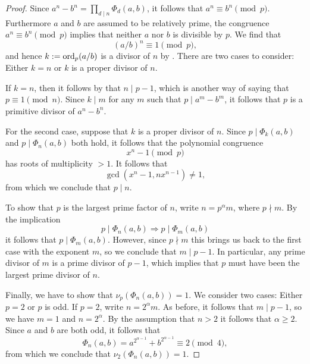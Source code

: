 \begin{proof}
  Since $a^n-b^n=\prod_{d\mid n}\Phi_d(a,b)$, it follows that $a^n\equiv b^n\pmod{p}$. Furthermore $a$ and $b$ are assumed to be relatively prime, the congruence $a^n\equiv b^n\pmod{p}$ implies that neither $a$ nor $b$ is divisible by $p$. We find that
  \begin{equation*}
    (a/b)^n\equiv 1\pmod{p},
  \end{equation*}
  and hence $k:=\operatorname{ord}_p(a/b)$ is a divisor of $n$ by . There are two cases to consider: Either $k=n$ or $k$ is a proper divisor of $n$.

  If $k=n$, then it follows by  that $n\mid p-1$, which is another way of saying that $p\equiv 1\pmod{n}$. Since $k\mid m$ for any $m$ such that $p\mid a^m-b^m$, it follows that $p$ is a primitive divisor of $a^n-b^n$.
  
  For the second case, suppose that $k$ is a proper divisor of $n$. Since $p\mid \Phi_k(a,b)$ and $p\mid \Phi_n(a,b)$ both hold, it follows that the polynomial congruence
  \begin{equation*}
    x^n-1\pmod{p}
  \end{equation*}
  has roots of multiplicity $>1$. It follows that
  \begin{equation*}
    \gcd(x^n-1,nx^{n-1})\neq 1,
  \end{equation*}
  from which we conclude that $p\mid n$.

  To show that $p$ is the largest prime factor of $n$, write $n=p^\alpha m$, where $p\nmid m$. By the implication
  \begin{equation*}
    p\mid \Phi_n(a,b)\Rightarrow p\mid \Phi_m(a,b)
  \end{equation*}
  it follows that $p\mid \Phi_m(a,b)$. However, since $p\nmid m$ this brings us back to the first case with the exponent $m$, so we conclude that $m\mid p-1$. In particular, any prime divisor of $m$ is a prime divisor of $p-1$, which implies that $p$ must have been the largest prime divisor of $n$.

  Finally, we have to show that $\nu_p(\Phi_n(a,b))=1$. We consider two cases: Either $p=2$ or $p$ is odd. If $p=2$, write $n=2^\alpha m$. As before, it follows that $m\mid p-1$, so we have $m=1$ and $n=2^\alpha$. By the assumption that $n>2$ it follows that $\alpha\geq 2$. Since $a$ and $b$ are both odd, it follows that
  \begin{equation*}
    \Phi_n(a,b)=a^{2^{\alpha-1}}+b^{2^{\alpha-1}}\equiv 2\pmod{4},
  \end{equation*}
  from which we conclude that $\nu_2(\Phi_n(a,b))=1$.


\end{proof}
